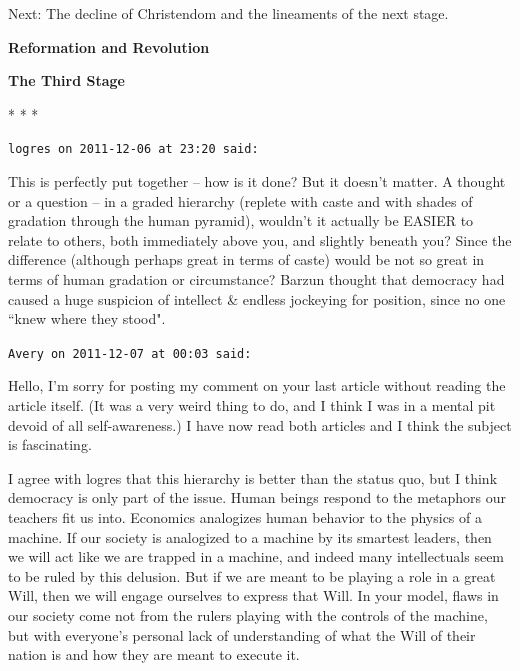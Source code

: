 Next: The decline of Christendom and the lineaments of the next stage.

\textbf{Reformation and Revolution}

\textbf{The Third Stage}


\hfill




\begin{center}* * *\end{center}

\begin{footnotesize}\begin{sffamily}



\texttt{logres on 2011-12-06 at 23:20 said: }

This is perfectly put together – how is it done? But it doesn't matter. A thought or a question – in a graded hierarchy (replete with caste and with shades of gradation through the human pyramid), wouldn't it actually be EASIER to relate to others, both immediately above you, and slightly beneath you? Since the difference (although perhaps great in terms of caste) would be not so great in terms of human gradation or circumstance? Barzun thought that democracy had caused a huge suspicion of intellect \& endless jockeying for position, since no one ``knew where they stood".


\hfill

\texttt{Avery on 2011-12-07 at 00:03 said: }

Hello, I'm sorry for posting my comment on your last article without reading the article itself. (It was a very weird thing to do, and I think I was in a mental pit devoid of all self-awareness.) I have now read both articles and I think the subject is fascinating. 

I agree with logres that this hierarchy is better than the status quo, but I think democracy is only part of the issue. Human beings respond to the metaphors our teachers fit us into. Economics analogizes human behavior to the physics of a machine. If our society is analogized to a machine by its smartest leaders, then we will act like we are trapped in a machine, and indeed many intellectuals seem to be ruled by this delusion. But if we are meant to be playing a role in a great Will, then we will engage ourselves to express that Will. In your model, flaws in our society come not from the rulers playing with the controls of the machine, but with everyone's personal lack of understanding of what the Will of their nation is and how they are meant to execute it.



\end{sffamily}
\end{footnotesize}
